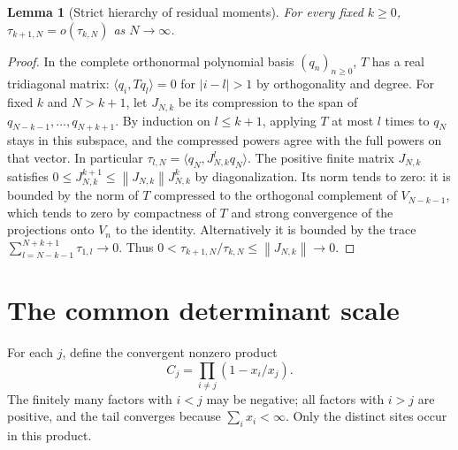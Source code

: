 \documentclass[11pt]{article}
\newtheorem{lemma}[theorem]{Lemma}
\theoremstyle{remark}\newtheorem{remark}[theorem]{Remark}
\newcommand{\norm}[1]{\left\lVert#1\right\rVert}
\begin{document}
\begin{lemma}[Strict hierarchy of residual moments]\label{lem:hierarchy}
For every fixed $k\ge0$, $\tau_{k+1,N}=o(\tau_{k,N})$ as $N\to\infty$.
\end{lemma}
\begin{proof}
In the complete orthonormal polynomial basis $(q_n)_{n\ge0}$, $T$ has a real tridiagonal matrix: $\langle q_i,Tq_l\rangle=0$ for $|i-l|>1$ by orthogonality and degree. For fixed $k$ and $N>k+1$, let $J_{N,k}$ be its compression to the span of $q_{N-k-1},\dots,q_{N+k+1}$. By induction on $l\le k+1$, applying $T$ at most $l$ times to $q_N$ stays in this subspace, and the compressed powers agree with the full powers on that vector. In particular $\tau_{l,N}=\langle q_N,J_{N,k}^{l}q_N\rangle$. The positive finite matrix $J_{N,k}$ satisfies $0\le J_{N,k}^{k+1}\le\norm{J_{N,k}}J_{N,k}^k$ by diagonalization. Its norm tends to zero: it is bounded by the norm of $T$ compressed to the orthogonal complement of $V_{N-k-1}$, which tends to zero by compactness of $T$ and strong convergence of the projections onto $V_n$ to the identity. Alternatively it is bounded by the trace $\sum_{l=N-k-1}^{N+k+1}\tau_{1,l}\to0$. Thus $0<\tau_{k+1,N}/\tau_{k,N}\le\norm{J_{N,k}}\to0$.
\end{proof}

\section{The common determinant scale}
For each $j$, define the convergent nonzero product
\begin{equation}\label{eq:C}
 C_j=\prod_{i\ne j}(1-x_i/x_j).
\end{equation}
The finitely many factors with $i<j$ may be negative; all factors with $i>j$ are positive, and the tail converges because $\sum_i x_i<\infty$. Only the distinct sites occur in this product.
\end{document}
